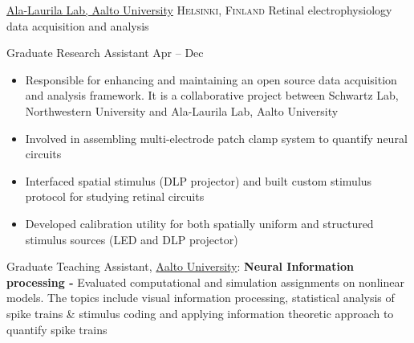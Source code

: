 
\headedsection  %
  {\href{http://ala-laurila.biosci.helsinki.fi/}{Ala-Laurila Lab, Aalto University}}
  {\textsc{Helsinki, Finland}} 
  {\newline{}Retinal electrophysiology data acquisition and analysis} 
  {%
  \headedsubsection
    {Graduate Research Assistant}
    {Apr  -- Dec }
    {
      \begin{itemize}     
        \item Responsible for enhancing and maintaining an open source data acquisition and analysis framework. It is a collaborative project between Schwartz Lab, Northwestern University and Ala-Laurila Lab, Aalto University
        \item Involved in assembling multi-electrode patch clamp system to quantify neural circuits
        \item Interfaced spatial stimulus (DLP projector) and built custom stimulus protocol for studying retinal circuits
        \item Developed calibration utility for both spatially uniform and structured stimulus sources (LED and DLP projector)
      \end{itemize}
    }
}

  \vspace{0.5em}

\inlineheadsection
{Graduate Teaching Assistant, \href{http://www.aalto.fi}{Aalto University}:}
{\textbf{Neural Information processing - }Evaluated computational and simulation assignments on  nonlinear models. The topics include visual information processing, statistical analysis of spike trains 
\& stimulus coding and applying information theoretic approach to quantify spike trains}
